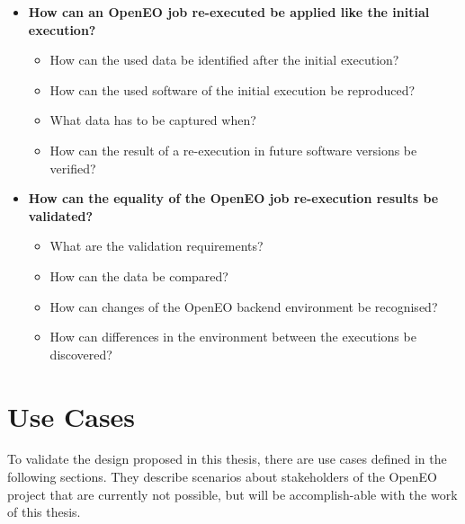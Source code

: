 \documentclass[draft,final]{vutinfth} %
\begin{document}
\begin{itemize}
	\item \textbf{How can an OpenEO job re-executed be applied like the initial execution?}
	\begin{itemize}
		\item How can the used data be identified after the initial execution?
		\item How can the used software of the initial execution be reproduced?
		\item What data has to be captured when?
		\item How can the result of a re-execution in future software versions be verified?
	\end{itemize}
	\item \textbf{How can the equality of the OpenEO job re-execution results be validated?}
	\begin{itemize}
		\item What are the validation requirements?
		\item How can the data be compared?
		\item How can changes of the OpenEO backend environment be recognised?
		\item How can differences in the environment between the executions be discovered?
	\end{itemize}
\end{itemize}

\section{Use Cases}\label{Use Cases}
To validate the design proposed in this thesis, there are use cases defined in the following sections. They describe scenarios about stakeholders of the OpenEO project that are currently not possible, but will be accomplish-able with the work of this thesis.
    
\end{document}
